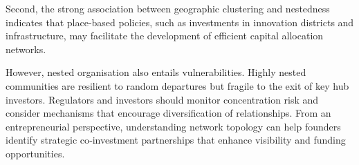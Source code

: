 Second, the strong association between geographic clustering and nestedness indicates that place‑based policies, such as investments in innovation districts and infrastructure, may facilitate the development of efficient capital allocation networks.

However, nested organisation also entails vulnerabilities.  Highly nested communities are resilient to random departures but fragile to the exit of key hub investors.  Regulators and investors should monitor concentration risk and consider mechanisms that encourage diversification of relationships.  From an entrepreneurial perspective, understanding network topology can help founders identify strategic co‑investment partnerships that enhance visibility and funding opportunities.

\pagebreak